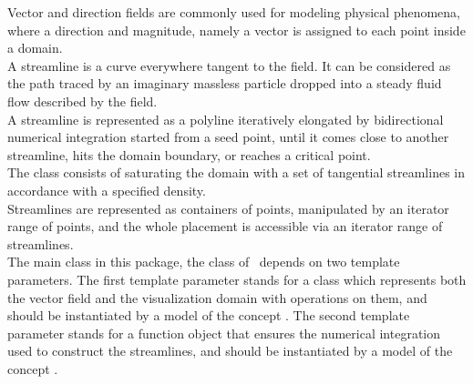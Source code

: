 
\label{ref_chapter_2D_Streamlines}




Vector and direction fields are commonly used for modeling physical
phenomena, where a direction and magnitude, namely a vector is assigned to
each point inside a domain.\\

A streamline is a curve everywhere tangent to the field. It can be
considered as the path traced by an imaginary massless particle
dropped into a steady fluid flow described by the field.\\

A streamline is represented as a polyline iteratively elongated by
bidirectional numerical integration started from a seed point, until
it comes close to another streamline, hits the domain boundary, or
reaches a critical point.\\

The  class consists of saturating the domain with
a set of tangential streamlines in accordance with a specified
density.\\

Streamlines are represented as containers of points, manipulated by an
iterator range of points, and the whole placement is accessible via an
iterator range of streamlines.\\

The main class in this package, the  class of \cgal\ depends on two template
parameters.  The first template parameter stands for a class which
represents both the vector field and the visualization domain with
operations on them, and should be instantiated by a model of the concept
.  The second template parameter stands for a
function object that ensures the numerical integration used to
construct the streamlines, and should be instantiated by a model of the concept
.

